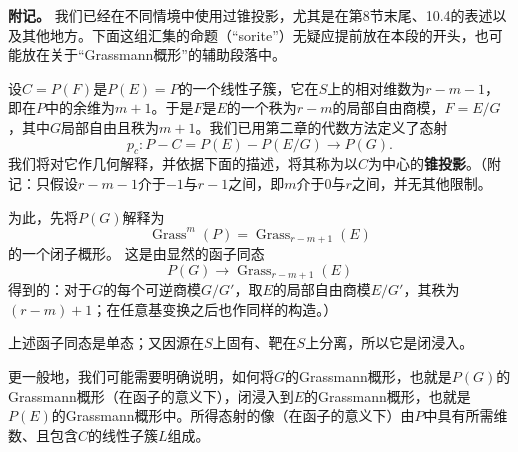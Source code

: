 
\noindent\textbf{附记。}
我们已经在不同情境中使用过锥投影，尤其是在第8节末尾、10.4的表述以及其他地方。下面这组汇集的命题（“sorite”）无疑应提前放在本段的开头，也可能放在关于“Grassmann概形”的辅助段落中。

设$C=P(F)$是$P(E)=P$的一个线性子簇，它在$S$上的相对维数为$r-m-1$，即在$P$中的余维为$m+1$。于是$F$是$E$的一个秩为$r-m$的局部自由商模，$F=E/G$，其中$G$局部自由且秩为$m+1$。我们已用第二章的代数方法定义了态射
\[
p_c:P-C=P(E)-P(E/G)\longrightarrow P(G).
\]
我们将对它作几何解释，并依据下面的描述，将其称为以$C$为中心的\textbf{锥投影}。（附记：只假设$r-m-1$介于$-1$与$r-1$之间，即$m$介于$0$与$r$之间，并无其他限制。

为此，先将$P(G)$解释为
\[
\operatorname{Grass}^{m}(P)=\operatorname{Grass}_{r-m+1}(E)
\]
的一个闭子概形。
这是由显然的函子同态
\[
P(G)\longrightarrow\operatorname{Grass}_{r-m+1}(E)
\]
得到的：对于$G$的每个可逆商模$G/G'$，取$E$的局部自由商模$E/G'$，其秩为$(r-m)+1$；在任意基变换之后也作同样的构造。）

上述函子同态是单态；又因源在$S$上固有、靶在$S$上分离，所以它是闭浸入。

更一般地，我们可能需要明确说明，如何将$G$的Grassmann概形，也就是$P(G)$的Grassmann概形（在函子的意义下），闭浸入到$E$的Grassmann概形，也就是$P(E)$的Grassmann概形中。所得态射的像（在函子的意义下）由$P$中具有所需维数、且包含$C$的线性子簇$L$组成。

